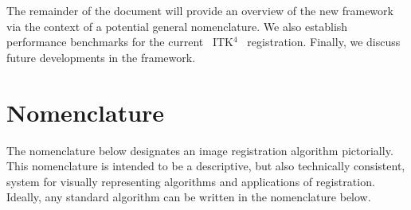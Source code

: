 \documentclass{llncs}
\newcommand{\tk}{~ITK$^{\text{4}}$~}
\begin{document}



The remainder of the document will provide an overview of the new
framework via the context of a potential general nomenclature.  We
also establish performance benchmarks for the current \tk
registration.  Finally, we discuss future developments in the
framework.

\section{Nomenclature}
The nomenclature below designates an image registration
algorithm pictorially.  This nomenclature is intended to be a
descriptive, but also technically consistent, system for visually
representing algorithms and applications of registration.  Ideally,
any standard algorithm can be written in the nomenclature below.
\end{document}
